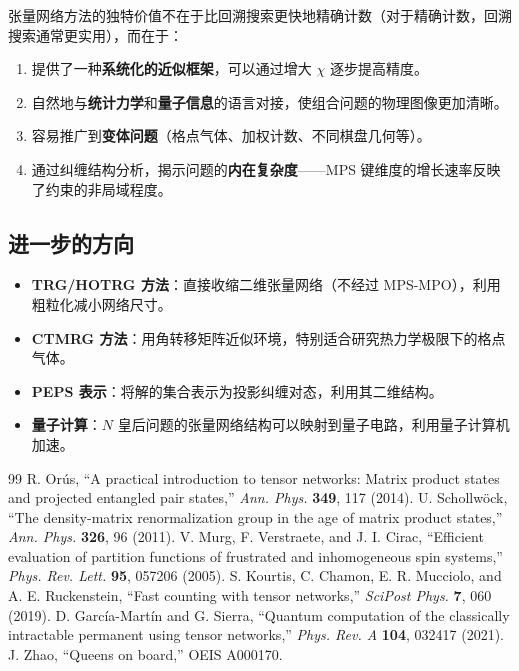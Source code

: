 \documentclass[12pt,a4paper]{ctexart}
\begin{document}
张量网络方法的独特价值不在于比回溯搜索更快地精确计数（对于精确计数，回溯搜索通常更实用），而在于：
\begin{enumerate}
    \item 提供了一种\textbf{系统化的近似框架}，可以通过增大 $\chi$ 逐步提高精度。
    \item 自然地与\textbf{统计力学}和\textbf{量子信息}的语言对接，使组合问题的物理图像更加清晰。
    \item 容易推广到\textbf{变体问题}（格点气体、加权计数、不同棋盘几何等）。
    \item 通过纠缠结构分析，揭示问题的\textbf{内在复杂度}——MPS 键维度的增长速率反映了约束的非局域程度。
\end{enumerate}

\subsection{进一步的方向}

\begin{itemize}
    \item \textbf{TRG/HOTRG 方法}：直接收缩二维张量网络（不经过 MPS-MPO），利用粗粒化减小网络尺寸。
    \item \textbf{CTMRG 方法}：用角转移矩阵近似环境，特别适合研究热力学极限下的格点气体。
    \item \textbf{PEPS 表示}：将解的集合表示为投影纠缠对态，利用其二维结构。
    \item \textbf{量子计算}：$N$ 皇后问题的张量网络结构可以映射到量子电路，利用量子计算机加速。
\end{itemize}

\vspace{0.5cm}

\begin{thebibliography}{99}
 R. Or\'{u}s, ``A practical introduction to tensor networks: Matrix product states and projected entangled pair states,'' \textit{Ann. Phys.} \textbf{349}, 117 (2014).
 U. Schollw\"{o}ck, ``The density-matrix renormalization group in the age of matrix product states,'' \textit{Ann. Phys.} \textbf{326}, 96 (2011).
 V. Murg, F. Verstraete, and J. I. Cirac, ``Efficient evaluation of partition functions of frustrated and inhomogeneous spin systems,'' \textit{Phys. Rev. Lett.} \textbf{95}, 057206 (2005).
 S. Kourtis, C. Chamon, E. R. Mucciolo, and A. E. Ruckenstein, ``Fast counting with tensor networks,'' \textit{SciPost Phys.} \textbf{7}, 060 (2019).
 D. Garc\'{i}a-Mart\'{i}n and G. Sierra, ``Quantum computation of the classically intractable permanent using tensor networks,'' \textit{Phys. Rev. A} \textbf{104}, 032417 (2021).
 J. Zhao, ``Queens on board,'' OEIS A000170.
\end{thebibliography}
\end{document}
